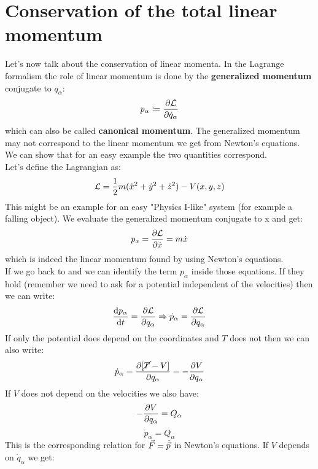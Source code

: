 \section{Conservation of the total linear momentum}
Let's now talk about the conservation of linear momenta. In the Lagrange formalism the role of linear momentum is done by the \textbf{generalized momentum} conjugate to $q_{\alpha}$:
\begin{equation}
    p_{\alpha} \coloneqq \dfrac{\partial \mathcal{L}}{\partial \dot{q}_{\alpha}}
\end{equation}
which can also be called \textbf{canonical momentum}. The generalized momentum may not correspond to the linear momentum we get from Newton's equations. We can show that for an easy example the two quantities correspond.\\
Let's define the Lagrangian as:
\begin{equation}
    \mathcal{L} = \dfrac{1}{2}m(\dot{x}^2 + \dot{y}^2 + \dot{z}^2) - V(x,y,z)
\end{equation}
This might be an example for an easy "Physics I-like" system (for example a falling object). We evaluate the generalized momentum conjugate to x and get:
\begin{equation}
    p_x = \dfrac{\partial \mathcal{L}}{\partial \dot{x}} = m\dot{x}
\end{equation}
which is indeed the linear momentum found by using Newton's equations.\\
If we go back to \eleref\;and \lagrangeref\;we can identify the term $p_{\alpha}$ inside those equations. If they hold (remember we need to ask for a potential independent of the velocities) then we can write:
\begin{equation}
    \dfrac{\mathrm{d}p_{\alpha}}{\mathrm{d}t} = \dfrac{\partial \mathcal{L}}{\partial q_{\alpha}} \Rightarrow \dot{p}_{\alpha} = \dfrac{\partial \mathcal{L}}{\partial q_{\alpha}}
\end{equation}
If only the potential does depend on the coordinates and $T$ does not then we can also write:
\begin{equation}
    \dot{p}_{\alpha} = \dfrac{\partial [\cancel{T}-V]}{\partial q_{\alpha}} = -\dfrac{\partial V}{\partial q_{\alpha}}
\end{equation}
If $V$ does not depend on the velocities we also have:
\begin{equation}
    -\dfrac{\partial V}{\partial q_{\alpha}} = Q_{\alpha}
\end{equation}
\begin{equation}
    \boxed{\dot{p}_{\alpha} = Q_{\alpha}}
\end{equation}
This is the corresponding relation for $\vec{F} = \dot{\vec{p}}$ in Newton's equations. If $V$ depends on $\dot{q}_{\alpha}$ we get:
